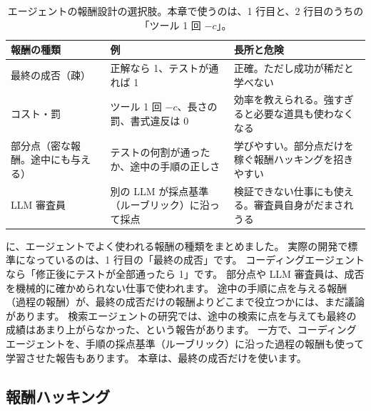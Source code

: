 \begin{table}[tbp]
\centering
\caption{エージェントの報酬設計の選択肢。本章で使うのは、1 行目と、2 行目のうちの「ツール 1 回 $-c$」。}
\label{tab:arl-reward-design}
\small
\begin{tabular}{p{28mm}p{44mm}p{46mm}}
\toprule
報酬の種類 & 例 & 長所と危険 \\
\midrule
最終の成否（疎） & 正解なら 1、テストが通れば 1 & 正確。ただし成功が稀だと学べない \\
コスト・罰 & ツール 1 回 $-c$、長さの罰、書式違反は 0 & 効率を教えられる。強すぎると必要な道具も使わなくなる \\
部分点（密な報酬。途中にも与える） & テストの何割が通ったか、途中の手順の正しさ & 学びやすい。部分点だけを稼ぐ報酬ハッキングを招きやすい \\
LLM 審査員 & 別の LLM が採点基準（ルーブリック）に沿って採点 & 検証できない仕事にも使える。審査員自身がだまされうる \\
\bottomrule
\end{tabular}
\end{table}

に、エージェントでよく使われる報酬の種類をまとめました。
実際の開発で標準になっているのは、1 行目の「最終の成否」です。
コーディングエージェントなら「修正後にテストが全部通ったら 1」です\cite{agentica2025deepswe}。
部分点や LLM 審査員は、成否を機械的に確かめられない仕事で使われます。
途中の手順に点を与える報酬（過程の報酬）が、最終の成否だけの報酬よりどこまで役立つかには、まだ議論があります。
検索エージェントの研究では、途中の検索に点を与えても最終の成績はあまり上がらなかった、という報告があります。
一方で、コーディングエージェントを、手順の採点基準（ルーブリック）に沿った過程の報酬も使って学習させた報告もあります。
本章は、最終の成否だけを使います。

\subsection{報酬ハッキング}

